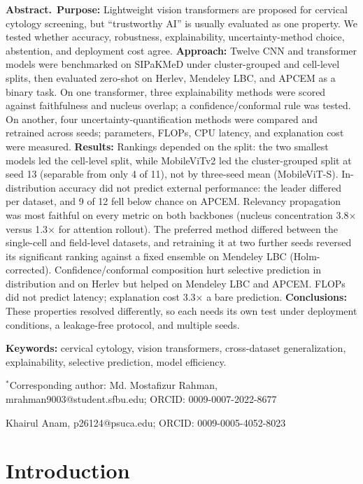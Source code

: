 \documentclass[12pt,letterpaper]{article}
\begin{document}
{\fontsize{10}{12}\selectfont
\noindent\textbf{Abstract.}\ \textbf{Purpose:}
Lightweight vision transformers are proposed for cervical cytology screening, but ``trustworthy AI'' is usually evaluated as one property. We tested whether accuracy, robustness, explainability, uncertainty-method choice, abstention, and deployment cost agree.
\textbf{Approach:}
Twelve CNN and transformer models were benchmarked on SIPaKMeD under cluster-grouped and cell-level splits, then evaluated zero-shot on Herlev, Mendeley LBC, and APCEM as a binary task. On one transformer, three explainability methods were scored against faithfulness and nucleus overlap; a confidence/conformal rule was tested. On another, four uncertainty-quantification methods were compared and retrained across seeds; parameters, FLOPs, CPU latency, and explanation cost were measured.
\textbf{Results:}
Rankings depended on the split: the two smallest models led the cell-level split, while MobileViTv2 led the cluster-grouped split at seed 13 (separable from only 4 of 11), not by three-seed mean (MobileViT-S). In-distribution accuracy did not predict external performance: the leader differed per dataset, and 9 of 12 fell below chance on APCEM. Relevancy propagation was most faithful on every metric on both backbones (nucleus concentration 3.8$\times$ versus 1.3$\times$ for attention rollout). The preferred method differed between the single-cell and field-level datasets, and retraining it at two further seeds reversed its significant ranking against a fixed ensemble on Mendeley LBC (Holm-corrected). Confidence/conformal composition hurt selective prediction in distribution and on Herlev but helped on Mendeley LBC and APCEM. FLOPs did not predict latency; explanation cost 3.3$\times$ a bare prediction.
\textbf{Conclusions:}
These properties resolved differently, so each needs its own test under deployment conditions, a leakage-free protocol, and multiple seeds.

\medskip
\noindent\textbf{Keywords:} cervical cytology, vision transformers, cross-dataset generalization, explainability, selective prediction, model efficiency.

\medskip
\noindent$^{*}$Corresponding author: Md. Mostafizur Rahman, mrahman9003@student.sfbu.edu; ORCID: 0009-0007-2022-8677

\noindent Khairul Anam, p26124@psuca.edu; ORCID: 0009-0005-4052-8023
}


\section{Introduction}
\label{sec:intro}
\end{document}
